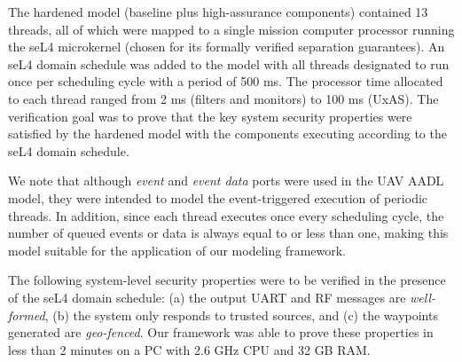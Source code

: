 The hardened model (baseline plus high-assurance components) contained 13 threads,
all of which were mapped to a single mission computer processor running the seL4 microkernel (chosen for its formally verified separation guarantees).
An seL4 domain schedule was added to the model with all threads designated to run once per scheduling cycle with a period of 500 ms.
The processor time allocated to each thread ranged from 2 ms (filters and monitors) to 100 ms (UxAS).
The verification goal was to prove that the key system security properties were satisfied by the hardened model with the components executing according to the seL4 domain schedule.

We note that although \textit{event} and \textit{event data} ports were used in the UAV AADL model, they were intended to model the event-triggered execution of periodic threads.
In addition, since each thread executes once every scheduling cycle, the number of queued events or data is always equal to or less than one,
making this model suitable for the application of our modeling framework.

The following system-level security properties were to be verified in the presence of the seL4 domain schedule:
(a) the output UART and RF messages are \emph{well-formed},
(b) the system only responds to trusted sources, and
(c) the waypoints generated are \emph{geo-fenced}.
Our framework was able to prove these properties in less than 2 minutes on a PC with 2.6 GHz CPU and 32 GB RAM.

